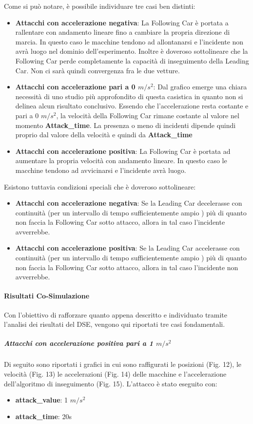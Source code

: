Come si può notare, è possibile individuare tre casi ben distinti:
\begin{itemize}
	\item \textbf{Attacchi con accelerazione negativa}: La Following Car è portata a rallentare con andamento lineare fino a cambiare la propria direzione di marcia. In questo caso le macchine tendono ad allontanarsi e l'incidente non avrà luogo nel dominio dell'esperimento. Inoltre è doveroso sottolineare che la Following Car perde completamente la capacità di inseguimento della Leading Car. Non ci sarà quindi convergenza fra le due vetture.
	\item \textbf{Attacchi con accelerazione pari a 0 $m/s^2$}: Dal grafico emerge una chiara necessità di uno studio più approfondito di questa casistica in quanto non si delinea alcun risultato conclusivo. Essendo che l'accelerazione resta costante e pari a 0 $m/s^2$, la velocità della Following Car rimane costante al valore nel momento \textbf{Attack\_time}. La presenza o meno di incidenti dipende quindi proprio dal valore della velocità e quindi da \textbf{Attack\_time}
	\item \textbf{Attacchi con accelerazione positiva}: La Following Car è portata ad aumentare la propria velocità con andamento lineare. In questo caso le macchine tendono ad avvicinarsi e l'incidente avrà luogo.
\end{itemize}
Esistono tuttavia condizioni speciali che è doveroso sottolineare:
\begin{itemize}
	\item \textbf{Attacchi con accelerazione negativa}: Se la Leading Car decelerasse con continuità (per un intervallo di tempo sufficientemente ampio ) più di quanto non faccia la Following Car sotto attacco, allora in tal caso l'incidente avverrebbe.
	\item \textbf{Attacchi con accelerazione positiva}: Se la Leading Car accelerasse con continuità (per un intervallo di tempo sufficientemente ampio ) più di quanto non faccia la Following Car sotto attacco, allora in tal caso l'incidente non avverrebbe.
\end{itemize}
\paragraph{Risultati Co-Simulazione}
Con l'obiettivo di rafforzare quanto appena descritto  e individuato tramite l'analisi dei risultati del DSE, vengono qui riportati tre casi fondamentali.
\subparagraph{Attacchi con accelerazione positiva pari a 1 $m/s^2$} Di seguito sono riportati i grafici in cui sono raffigurati le posizioni (Fig. 12), le velocità (Fig. 13) le accelerazioni (Fig. 14) delle macchine e l'accelerazione dell'algoritmo di inseguimento (Fig. 15).
L'attacco è stato eseguito con:
\begin{itemize}
	\item \textbf{attack\_value}: 1 $m/s^2$
	\item \textbf{attack\_time}: 20s
\end{itemize}


